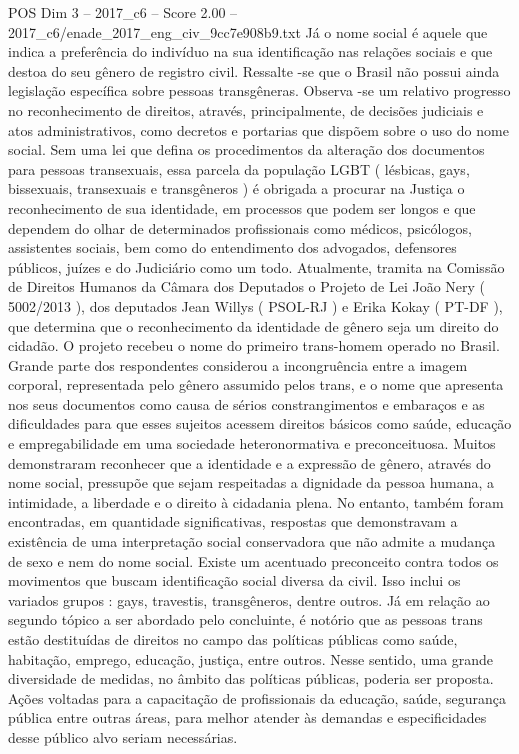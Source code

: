 \begin{textsample}{POS Dim 3 – 2017\_c6 – Score 2.00 – 2017\_c6/enade\_2017\_eng\_civ\_9cc7e908b9.txt}
Já o nome social é aquele que indica a preferência do indivíduo na sua identificação nas relações sociais e que destoa do seu gênero de registro civil.
Ressalte -se que o Brasil não possui ainda legislação específica sobre pessoas transgêneras.
Observa -se um relativo progresso no reconhecimento de direitos, através, principalmente, de decisões judiciais e atos administrativos, como decretos e portarias que dispõem sobre o uso do nome social.
Sem uma lei que defina os procedimentos da alteração dos documentos para pessoas transexuais, essa parcela da população LGBT ( lésbicas, gays, bissexuais, transexuais e transgêneros ) é obrigada a procurar na Justiça o reconhecimento de sua identidade, em processos que podem ser longos e que dependem do olhar de determinados profissionais como médicos, psicólogos, assistentes sociais, bem como do entendimento dos advogados, defensores públicos, juízes e do Judiciário como um todo.
Atualmente, tramita na Comissão de Direitos Humanos da Câmara dos Deputados o Projeto de Lei João Nery ( 5002/2013 ), dos deputados Jean Willys ( PSOL-RJ ) e Erika Kokay ( PT-DF ), que determina que o reconhecimento da identidade de gênero seja um direito do cidadão.
O projeto recebeu o nome do primeiro trans-homem operado no Brasil.
Grande parte dos respondentes considerou a incongruência entre a imagem corporal, representada pelo gênero assumido pelos trans, e o nome que apresenta nos seus documentos como causa de sérios constrangimentos e embaraços e as dificuldades para que esses sujeitos acessem direitos básicos como saúde, educação e empregabilidade em uma sociedade heteronormativa e preconceituosa.
Muitos demonstraram reconhecer que a identidade e a expressão de gênero, através do nome social, pressupõe que sejam respeitadas a dignidade da pessoa humana, a intimidade, a liberdade e o direito à cidadania plena.
No entanto, também foram encontradas, em quantidade significativas, respostas que demonstravam a existência de uma interpretação social conservadora que não admite a mudança de sexo e nem do nome social.
Existe um acentuado preconceito contra todos os movimentos que buscam identificação social diversa da civil.
Isso inclui os variados grupos : gays, travestis, transgêneros, dentre outros.
Já em relação ao segundo tópico a ser abordado pelo concluinte, é notório que as pessoas trans estão destituídas de direitos no campo das políticas públicas como saúde, habitação, emprego, educação, justiça, entre outros.
Nesse sentido, uma grande diversidade de medidas, no âmbito das políticas públicas, poderia ser proposta.
Ações voltadas para a capacitação de profissionais da educação, saúde, segurança pública entre outras áreas, para melhor atender às demandas e especificidades desse público alvo seriam necessárias.

\end{textsample}
